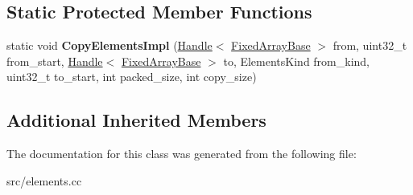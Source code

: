 \subsection*{Static Protected Member Functions}
\begin{DoxyCompactItemize}
\item 
\hypertarget{classv8_1_1internal_1_1_fast_double_elements_accessor_aa5927c756bcfaf071b9ecf11462bff9d}{}static void {\bfseries Copy\+Elements\+Impl} (\hyperlink{classv8_1_1internal_1_1_handle}{Handle}$<$ \hyperlink{classv8_1_1internal_1_1_fixed_array_base}{Fixed\+Array\+Base} $>$ from, uint32\+\_\+t from\+\_\+start, \hyperlink{classv8_1_1internal_1_1_handle}{Handle}$<$ \hyperlink{classv8_1_1internal_1_1_fixed_array_base}{Fixed\+Array\+Base} $>$ to, Elements\+Kind from\+\_\+kind, uint32\+\_\+t to\+\_\+start, int packed\+\_\+size, int copy\+\_\+size)\label{classv8_1_1internal_1_1_fast_double_elements_accessor_aa5927c756bcfaf071b9ecf11462bff9d}

\end{DoxyCompactItemize}
\subsection*{Additional Inherited Members}


The documentation for this class was generated from the following file\+:\begin{DoxyCompactItemize}
\item 
src/elements.\+cc\end{DoxyCompactItemize}
